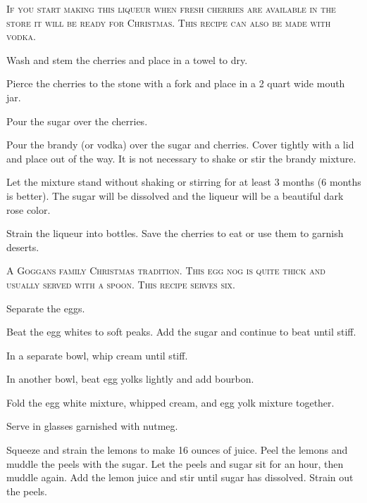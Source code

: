\documentclass[letterpaper]{recipePMG}
\begin{document}

\textsc{If you start making this liqueur when fresh cherries are
available in the store it will be ready for Christmas.  This
recipe can also be made with vodka.}

Wash and stem the cherries and place in a towel to dry.

Pierce the cherries to the stone with a fork and place in a 2
quart wide mouth jar.

Pour the sugar over the cherries.

Pour the brandy (or vodka) over the sugar and cherries.  Cover
tightly with a lid and place out of the way.  It is not necessary
to shake or stir the brandy mixture.

Let the mixture stand without shaking or stirring for at least
3 months (6 months is better).  The sugar will be dissolved and
the liqueur will be a beautiful dark rose color.

Strain the liqueur into  bottles. Save the cherries to eat or use them
to garnish deserts.



\textsc{A Goggans family Christmas tradition.  This egg nog is quite thick and
usually served with a spoon.  This recipe serves six.}

Separate the eggs.

Beat the egg whites to soft peaks.  Add the sugar and continue
to beat until stiff.

In a separate bowl, whip cream until stiff.

In another bowl, beat egg yolks lightly and add bourbon.

Fold the egg white mixture, whipped cream, and egg yolk mixture
together.

Serve in glasses garnished with nutmeg.

\newpage
{}



Squeeze and strain the lemons to make 16 ounces of juice. Peel the lemons and muddle the peels with the sugar. Let the peels and sugar sit for an hour, then muddle again. Add the lemon juice and stir until sugar has dissolved. Strain out the peels.
\end{document}
